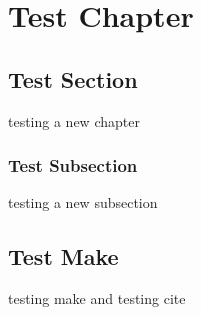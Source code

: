 \chapter{Test Chapter}
\section{Test Section}
testing a new chapter
\subsection{Test Subsection}
testing a new subsection
\section{Test Make}
testing make and testing cite \cite{candlerRateEffectsHypersonic2019}
